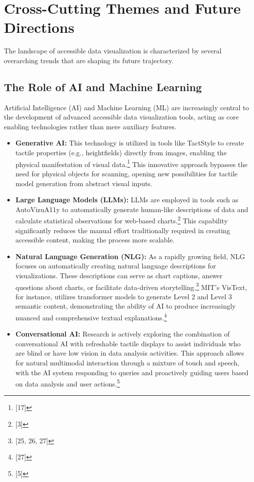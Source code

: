 \vspace{1em}

\section{Cross-Cutting Themes and Future Directions}
The landscape of accessible data visualization is characterized by several overarching trends that are shaping its future trajectory.

\subsection{The Role of AI and Machine Learning}
Artificial Intelligence (AI) and Machine Learning (ML) are increasingly central to the development of advanced accessible data visualization tools, acting as core enabling technologies rather than mere auxiliary features.

\begin{itemize}
    \item \textbf{Generative AI:} This technology is utilized in tools like TactStyle to create tactile properties (e.g., heightfields) directly from images, enabling the physical manifestation of visual data.\footnote{[17]} This innovative approach bypasses the need for physical objects for scanning, opening new possibilities for tactile model generation from abstract visual inputs.
    \item \textbf{Large Language Models (LLMs):} LLMs are employed in tools such as AutoVizuA11y to automatically generate human-like descriptions of data and calculate statistical observations for web-based charts.\footnote{[3]} This capability significantly reduces the manual effort traditionally required in creating accessible content, making the process more scalable.
    \item \textbf{Natural Language Generation (NLG):} As a rapidly growing field, NLG focuses on automatically creating natural language descriptions for visualizations. These descriptions can serve as chart captions, answer questions about charts, or facilitate data-driven storytelling.\footnote{[25, 26, 27]} MIT's VisText, for instance, utilizes transformer models to generate Level 2 and Level 3 semantic content, demonstrating the ability of AI to produce increasingly nuanced and comprehensive textual explanations.\footnote{[27]}
    \item \textbf{Conversational AI:} Research is actively exploring the combination of conversational AI with refreshable tactile displays to assist individuals who are blind or have low vision in data analysis activities. This approach allows for natural multimodal interaction through a mixture of touch and speech, with the AI system responding to queries and proactively guiding users based on data analysis and user actions.\footnote{[5]}
\end{itemize}

